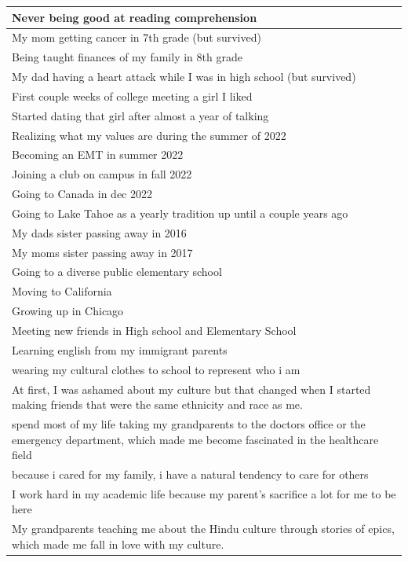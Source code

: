 \documentclass[
  .7em,
  letterpaper,
  DIV=11,
  numbers=noendperiod]{scrartcl}
\begin{document}
\begin{table}
\begin{tabular}{l}
\hline
Never being good at reading comprehension\\
\hline
My mom getting cancer in 7th grade (but survived)\\
\hline
Being taught finances of my family in 8th grade\\
\hline
My dad having a heart attack while I was in high school (but survived)\\
\hline
First couple weeks of college meeting a girl I liked\\
\hline
Started dating that girl after almost a year of talking\\
\hline
Realizing what my values are during the summer of 2022\\
\hline
Becoming an EMT in summer 2022\\
\hline
Joining a club on campus in fall 2022\\
\hline
Going to Canada in dec 2022\\
\hline
Going to Lake Tahoe as a yearly tradition up until a couple years ago\\
\hline
My dads sister passing away in 2016\\
\hline
My moms sister passing away in 2017\\
\hline
Going to a diverse public elementary school\\
\hline
Moving to California\\
\hline
Growing up in Chicago\\
\hline
Meeting new friends in High school and Elementary School\\
\hline
Learning english from my immigrant parents\\
\hline
wearing my cultural clothes to school to represent who i am\\
\hline
At first, I was ashamed about my culture but that changed when I started making friends that were the same ethnicity and race as me.\\
\hline
spend most of my life taking my grandparents to the doctors office or the emergency department, which made me become fascinated in the healthcare field\\
\hline
because i cared for my family, i have a natural tendency to care for others\\
\hline
I work hard in my academic life because my parent's sacrifice a lot for me to be here\\
\hline
My grandparents teaching me about the Hindu culture through stories of epics, which made me fall in love with my culture.\\

\end{tabular}
\end{table}
\end{document}
